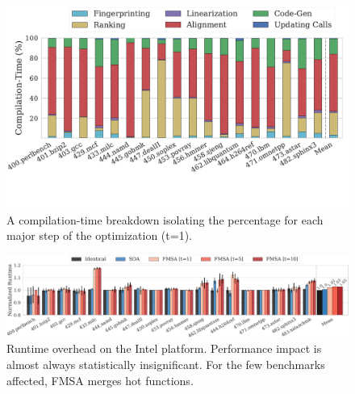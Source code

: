 \begin{figure}[t]
  \centering
  \includegraphics[width=1.0\linewidth]{figs/compilation-time-breakdown-sqrd.pdf}
  \vspace{-4em}
  \caption{A compilation-time breakdown isolating the percentage for each major
           step of the optimization (t=1).}%
  \label{fig:compilation-time-breakdown}
\end{figure}

\begin{figure}[t]
  \centering
  \includegraphics[width=\linewidth]{figs/runtime-impact.pdf}
  \caption{Runtime overhead on the Intel platform. Performance impact is almost always statistically insignificant. For the few benchmarks affected, FMSA merges hot functions.}
  \label{fig:runtime-impact}
\end{figure}

